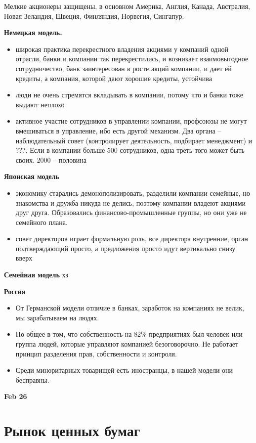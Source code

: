 \documentclass[a4paper, 12pt]{article}
\def\datee#1{\hfill\textbf{#1} \par}
\begin{document}
Мелкие акционеры защищены, в основном Америка, Англия, Канада, Австралия, Новая Зеландия, Швеция, Финляндия, Норвегия, Сингапур. 

\textbf{Немецкая модель.} 
\begin{itemize}
\item широкая практика перекрестного владения акциями у компаний одной отрасли, банки и компании так перекрестились, и возникает взаимовыгодное сотрудничество, банк заинтересован в росте акций компании, и дает ей кредиты, а компания, которой дают хорошие кредиты, устойчива 
\item люди не очень стремятся вкладывать в компании, потому что и банки тоже выдают неплохо 
\item активное участие сотрудников в управлении компании, профсоюзы не могут вмешиваться в управление, ибо есть другой механизм. Два органа -- наблюдательный совет (контролирует деятельность, подбирает менеджмент) и ???. Если в компании больше 500 сотрудников, одна треть того может быть своих. 2000 -- половина
\end{itemize}

\textbf{Японская модель}
\begin{itemize}
\item экономику старались демонополизировать, разделили компании семейные, но знакомства и дружба никуда не делись, поэтому компании владеют акциями друг друга. Образовались финансово-промышленные группы, но они уже не семейного плана. 
\item совет директоров играет формальную роль, все директора внутренние, орган подтверждающий просто, а предложения просто идут вертикально снизу вверх 
\end{itemize}

\textbf{Семейная модель}
хз

\textbf{Россия}
\begin{itemize}
\item От Германской модели отличие в банках, заработок на компаниях не велик, мы зарабатываем на людях. 
\item Но общее в том, что собственность на 82\% предприятиях был человек или группа людей, которые управляют компанией безоговорочно. Не работает принцип разделения прав, собственности и контроля. 
\item Среди миноритарных товарищей есть иностранцы, в нашей модели они бесправны. 
\end{itemize}


\datee{Feb 26}

\section{Рынок ценных бумаг}
\end{document}
